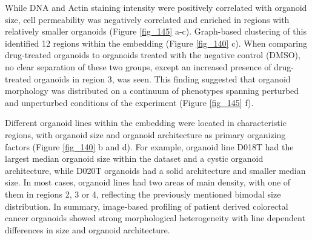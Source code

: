 \begin{flushleft}
\bigbreak
While DNA and Actin staining intensity were positively correlated with organoid size, cell permeability was negatively correlated and enriched in regions with relatively smaller organoids (Figure \ref{fig_145} a-c). Graph-based clustering of this identified 12 regions within the embedding (Figure \ref{fig_140} c). When comparing drug-treated organoids to organoids treated with the negative control (DMSO), no clear separation of these two groups, except an increased presence of drug-treated organoids in region 3,  was seen. This finding suggested that organoid morphology was distributed on a continuum of phenotypes spanning perturbed and unperturbed conditions of the experiment (Figure \ref{fig_145} f). 
\bigbreak

Different organoid lines within the embedding were located in characteristic regions, with organoid size and organoid architecture as primary organizing factors (Figure \ref{fig_140} b and d). For example, organoid line D018T had the largest median organoid size within the dataset and a cystic organoid architecture, while D020T organoids had a solid architecture and smaller median size. In most cases, organoid lines had two areas of main density, with one of them in regions 2, 3 or 4, reflecting the previously mentioned bimodal size distribution. In summary, image-based profiling of patient derived colorectal cancer organoids showed strong morphological heterogeneity with line dependent differences in size and organoid architecture.


\end{flushleft}
